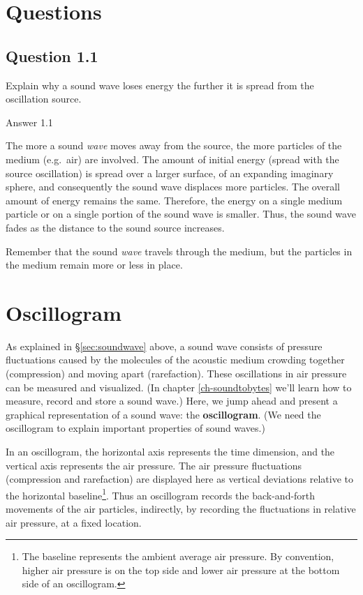 \documentclass[
]{book}
\begin{document}
\label{questions-soundwaves}
\section*{Questions}\label{questions-1}

\subsection*{Question 1.1}\label{question-1.1}

Explain why a sound wave loses energy the further it is spread from the oscillation source.

Answer 1.1

The more a sound \emph{wave} moves away from the source, the more particles of the medium (e.g.~air) are involved. The amount of initial energy (spread with the source oscillation) is spread over a larger surface, of an expanding imaginary sphere, and consequently the sound wave displaces more particles. The overall amount of energy remains the same. Therefore, the energy on a single medium particle or on a single portion of the sound wave is smaller. Thus, the sound wave fades as the distance to the sound source increases.

Remember that the sound \emph{wave} travels through the medium, but the particles in the medium remain more or less in place.

\section{Oscillogram}\label{sec:oscillogram}

As explained in §\ref{sec:soundwave} above, a sound wave consists of pressure fluctuations caused by the molecules of the acoustic medium crowding together (compression) and moving apart (rarefaction). These oscillations in air pressure can be measured and visualized. (In chapter \ref{ch-soundtobytes} we'll learn how to measure, record and store a sound wave.) Here, we jump ahead and present a graphical representation of a sound wave: the \textbf{oscillogram}.
(We need the oscillogram to explain important properties of sound waves.)

In an oscillogram, the horizontal axis represents the time dimension, and the vertical axis represents the air pressure. The air pressure fluctuations (compression and rarefaction) are displayed here as vertical deviations relative to the horizontal baseline\footnote{The baseline represents the ambient average air pressure. By convention, higher air pressure is on the top side and lower air pressure at the bottom side of an oscillogram.}.
Thus an oscillogram records the back-and-forth movements of the air particles, indirectly, by recording the fluctuations in relative air pressure, at a fixed location.
\end{document}
